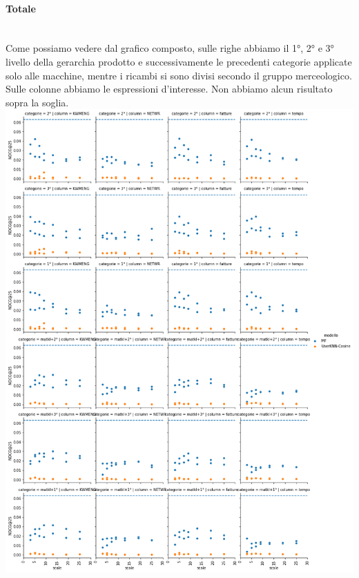 \paragraph{Totale}\mbox{} \\
Come possiamo vedere dal grafico composto, sulle righe abbiamo il 1°, 2° e 3° livello della gerarchia prodotto e successivamente le precedenti categorie applicate solo alle macchine, mentre i ricambi si sono divisi secondo il gruppo merceologico. Sulle colonne abbiamo le espressioni d'interesse. Non abbiamo alcun risultato sopra la soglia.\\

\includegraphics[width=16cm]{figures/risultati_ordered_categoria_totale.png}


